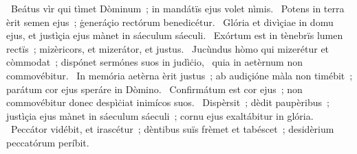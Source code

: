 \psalmChapterWithInscription{}
{ }
{%
~Beátus vìr qui tìmet Dòminum~; in mandátïs ejus volet nìmis. 
~Potens in terra èrit semen ejus~; ġeneráçio rectórum benedicétur. 
~Glória et divìçiae in domu ejus, et justìçia ejus mànet in sáeculum sáeculi. 
~Exórtum est in tènebrïs lumen rectïs~; mizèricors, et mizerátor, et justus. 
~Jucùndus hòmo qui mizerétur et còmmodat~; dispónet sermónes suos in judìċio, 
~quia in aetèrnum non commovébitur. 
~In memória aetèrna èrit justus~; ab audiçióne màla non timébit~; parátum cor ejus speráre in Dòmino. 
~Confirmátum est cor ejus~; non commovébitur donec despìċiat inimícos suos. 
~Dispèrsit~; dèdit paupèribus~; justìçia ejus mànet in sáeculum sáeculi~; cornu ejus exaltábitur in glória. 
~Peccátor vidébit, et irascétur~; dèntibus suïs frèmet et tabéscet~; desidèrium peccatórum períbit. 
}
